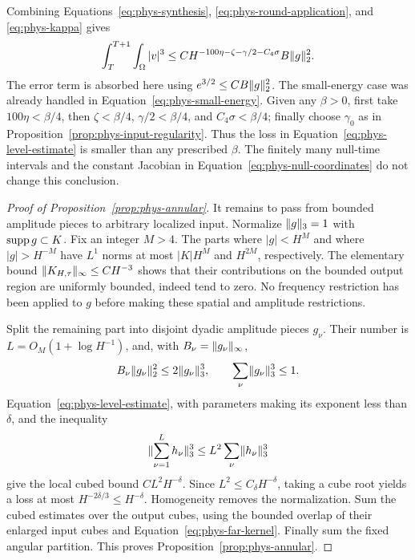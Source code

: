 Combining Equations~\eqref{eq:phys-synthesis},
\eqref{eq:phys-round-application}, and \eqref{eq:phys-kappa} gives
\begin{equation}
 \int_T^{T+1}\int_\Omega |v|^3
 \le C H^{-100\eta-\zeta-\gamma/2-C_4\sigma}
                    B\lVert g\rVert_2^2.
 \label{eq:phys-level-estimate}
\end{equation}
The error term is absorbed here using
$e^{3/2}\le C B\lVert g\rVert_2^2$.  The small-energy case was already
handled in Equation~\eqref{eq:phys-small-energy}.  Given any
$\beta>0$, first take $100\eta<\beta/4$, then
$\zeta<\beta/4$, $\gamma/2<\beta/4$, and
$C_4\sigma<\beta/4$; finally choose $\gamma_0$ as in
Proposition~\ref{prop:phys-input-regularity}.  Thus the loss in
Equation~\eqref{eq:phys-level-estimate} is smaller than any prescribed
$\beta$.  The finitely many null-time intervals and the constant
Jacobian in Equation~\eqref{eq:phys-null-coordinates} do not change
this conclusion.

\begin{proof}[Proof of Proposition~\ref{prop:phys-annular}]
It remains to pass from bounded amplitude pieces to arbitrary
localized input.  Normalize $\lVert g\rVert_3=1$ with $\operatorname{supp} g\subset K$.
Fix an integer $M>4$.  The parts where $|g|<H^M$ and where
$|g|>H^{-M}$ have $L^1$ norms at most $|K|H^M$ and $H^{2M}$,
respectively.  The elementary bound
$\lVert K_{H,\tau}\rVert_\infty\le C H^{-3}$ shows that their contributions
on the bounded output region are uniformly bounded, indeed tend
to zero.  No frequency restriction has been applied to $g$ before
making these spatial and amplitude restrictions.

Split the remaining part into disjoint dyadic amplitude pieces
$g_\nu$.  Their number is $L=O_M(1+\log H^{-1})$, and, with
$B_\nu=\lVert g_\nu\rVert_\infty$,
\[
 B_\nu\lVert g_\nu\rVert_2^2\le2\lVert g_\nu\rVert_3^3,
 \qquad \sum_\nu\lVert g_\nu\rVert_3^3\le1.
\]
Equation~\eqref{eq:phys-level-estimate}, with parameters making its
exponent less than $\delta$, and the inequality
\[
 \lVert \sum_{\nu=1}^L h_\nu\rVert_3^3
 \le L^2\sum_\nu\lVert h_\nu\rVert_3^3
\]
give the local cubed bound $C L^2H^{-\delta}$.
Since $L^2\le C_\delta H^{-\delta}$, taking a cube root yields a
loss at most $H^{-2\delta/3}\le H^{-\delta}$.  Homogeneity removes
the normalization.  Sum the cubed estimates over the output cubes,
using the bounded overlap of their enlarged input cubes and
Equation~\eqref{eq:phys-far-kernel}.  Finally sum the fixed angular
partition.  This proves Proposition~\ref{prop:phys-annular}.
\end{proof}

